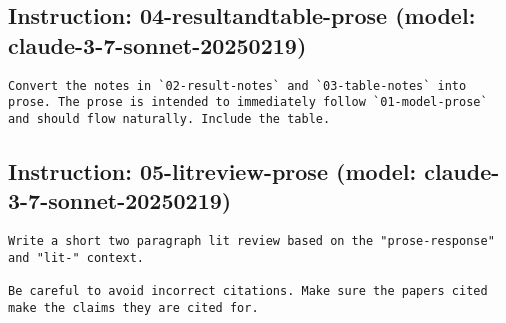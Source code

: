 \subsection*{Instruction: 04-resultandtable-prose  (model: claude-3-7-sonnet-20250219)}
\vspace{-1ex}
\begin{lstlisting}[language=text,breaklines=true,frame=single]
Convert the notes in `02-result-notes` and `03-table-notes` into prose. The prose is intended to immediately follow `01-model-prose` and should flow naturally. Include the table.

\end{lstlisting}
\vspace{-3ex}
\subsection*{Instruction: 05-litreview-prose  (model: claude-3-7-sonnet-20250219)}
\vspace{-1ex}
\begin{lstlisting}[language=text,breaklines=true,frame=single]
Write a short two paragraph lit review based on the "prose-response" and "lit-" context. 

Be careful to avoid incorrect citations. Make sure the papers cited make the claims they are cited for.

\end{lstlisting}
\vspace{-3ex}
